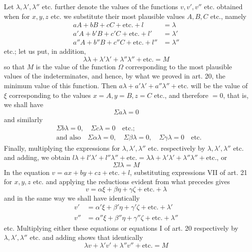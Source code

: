 Let \(\lambda,\lambda',\lambda''\) etc. further denote the values of the functions \(v,v',v''\) etc. obtained when for \(x,y,z\) etc. we substitute their most plausible values \(A,B,C\) etc., namely
\[
\begin{aligned}
aA+bB+cC+\text{etc.}+l&=\lambda\\
a'A+b'B+c'C+\text{etc.}+l'&=\lambda'\\
a''A+b''B+c''C+\text{etc.}+l''&=\lambda''
\end{aligned}
\]
etc.; let us put, in addition,
\[
\lambda\lambda+\lambda'\lambda'+\lambda''\lambda''+\text{etc.}=M
\]
so that \(M\) is the value of the function \(\Omega\) corresponding to the most plausible values of the indeterminates, and hence, by what we proved in art. 20, the minimum value of this function. Then \(a\lambda+a'\lambda'+a''\lambda''+\text{etc.}\) will be the value of \(\xi\) corresponding to the values \(x=A,\allowbreak y=B,\allowbreak z=C\) etc., and therefore \(=0\), that is, we shall have
\[
\Sigma a\lambda=0
\]
and similarly
\[
\begin{aligned}
&\Sigma b\lambda=0,\quad\Sigma c\lambda=0\quad\text{etc.;}\\
&\text{and also}\quad\Sigma\alpha\lambda=0,\quad\Sigma\beta\lambda=0,\quad\Sigma\gamma\lambda=0\quad\text{etc.}
\end{aligned}
\]
Finally, multiplying the expressions for \(\lambda,\lambda',\lambda''\) etc. respectively by \(\lambda,\lambda',\lambda''\) etc. and adding, we obtain \(l\lambda+l'\lambda'+l''\lambda''+\text{etc.}=\lambda\lambda+\lambda'\lambda'+\lambda''\lambda''+\text{etc.}\), or
\[
\Sigma l\lambda=M
\]
In the equation \(v=ax+by+cz+\text{etc.}+l\), substituting expressions VII of art. 21 for \(x,y,z\) etc. and applying the reductions evident from what precedes gives
\[
v=\alpha\xi+\beta\eta+\gamma\zeta+\text{etc.}+\lambda
\]
and in the same way we shall have identically
\[
\begin{aligned}
v'&=\alpha'\xi+\beta'\eta+\gamma'\zeta+\text{etc.}+\lambda'\\
v''&=\alpha''\xi+\beta''\eta+\gamma''\zeta+\text{etc.}+\lambda''
\end{aligned}
\]
etc. Multiplying either these equations or equations I of art. 20 respectively by \(\lambda,\lambda',\lambda''\) etc. and adding shows that identically
\[
\lambda v+\lambda'v'+\lambda''v''+\text{etc.}=M
\]
\clearpage
